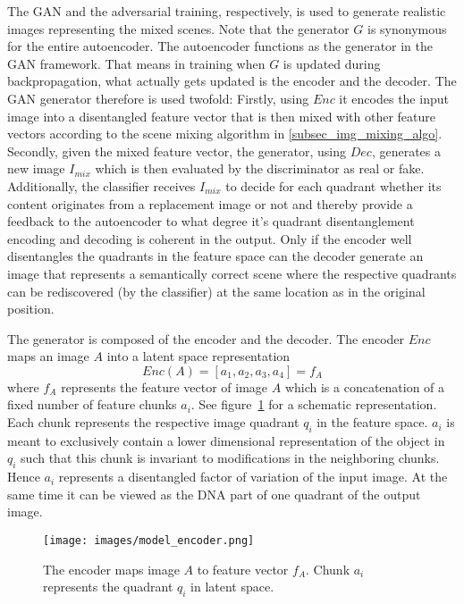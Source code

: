 \documentclass[12pt,a4paper]{article}
\begin{document}
The GAN and the adversarial training, respectively, is used to generate realistic images representing the mixed scenes. Note that the generator $G$ is synonymous for the entire autoencoder. The autoencoder functions as the generator in the GAN framework. That means in training when $G$ is updated during backpropagation, what actually gets updated is the encoder and the decoder. The GAN generator therefore is used twofold: Firstly, using $Enc$ it encodes the input image into a disentangled feature vector that is then mixed with other feature vectors according to the scene mixing algorithm in \ref{subsec_img_mixing_algo}. Secondly, given the mixed feature vector, the generator, using $Dec$, generates a new image $I_{mix}$ which is then evaluated by the discriminator as real or fake. Additionally, the classifier receives $I_{mix}$ to decide for each quadrant whether its content originates from a replacement image or not and thereby provide a feedback to the autoencoder to what degree it's quadrant disentanglement encoding and decoding is coherent in the output. Only if the encoder well disentangles the quadrants in the feature space can the decoder generate an image that represents a semantically correct scene where the respective quadrants can be rediscovered (by the classifier) at the same location as in the original position.

The generator is composed of the encoder and the decoder. The encoder $Enc$ maps an image $A$ into a latent space representation
\begin{equation} \label{eq:2}
    Enc(A) = [a_1, a_2, a_3, a_4] = f_A
\end{equation}
where $f_A$ represents the feature vector of image $A$ which is a concatenation of a fixed number of feature chunks $a_i$. See figure~\ref{fig:encoder} for a schematic representation. Each chunk represents the respective image quadrant $q_i$ in the feature space. $a_i$ is meant to exclusively contain a lower dimensional representation of the object in $q_i$ such that this chunk is invariant to modifications in the neighboring chunks. Hence $a_i$ represents a disentangled factor of variation of the input image. At the same time it can be viewed as the DNA part of one quadrant of the output image.

\begin{figure}[ht]
\centering
\texttt{[image: images/model\_encoder.png]}
\caption{The encoder maps image $A$ to feature vector $f_A$. Chunk $a_i$ represents the quadrant $q_i$ in latent space.}
\label{fig:encoder}
\end{figure}
\end{document}
